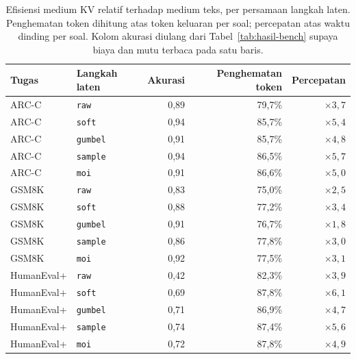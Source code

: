 \begin{table}[htbp]
\centering
\caption{Efisiensi medium KV relatif terhadap medium teks, per persamaan langkah laten. Penghematan token dihitung atas token keluaran per soal; percepatan atas waktu dinding per soal. Kolom akurasi diulang dari Tabel~\ref{tab:hasil-bench} supaya biaya dan mutu terbaca pada satu baris.}
\label{tab:efisiensi}
\small
\begin{tabular}{llrrr}
\hline
Tugas & Langkah laten & Akurasi & Penghematan token & Percepatan \\
\hline
ARC-C & \texttt{raw} & 0,89 & 79,7\% & $\times3,7$ \\
ARC-C & \texttt{soft} & 0,94 & 85,7\% & $\times5,4$ \\
ARC-C & \texttt{gumbel} & 0,91 & 85,7\% & $\times4,8$ \\
ARC-C & \texttt{sample} & 0,94 & 86,5\% & $\times5,7$ \\
ARC-C & \texttt{moi} & 0,91 & 86,6\% & $\times5,0$ \\
\hline
GSM8K & \texttt{raw} & 0,83 & 75,0\% & $\times2,5$ \\
GSM8K & \texttt{soft} & 0,88 & 77,2\% & $\times3,4$ \\
GSM8K & \texttt{gumbel} & 0,91 & 76,7\% & $\times1,8$ \\
GSM8K & \texttt{sample} & 0,86 & 77,8\% & $\times3,0$ \\
GSM8K & \texttt{moi} & 0,92 & 77,5\% & $\times3,1$ \\
\hline
HumanEval+ & \texttt{raw} & 0,42 & 82,3\% & $\times3,9$ \\
HumanEval+ & \texttt{soft} & 0,69 & 87,8\% & $\times6,1$ \\
HumanEval+ & \texttt{gumbel} & 0,71 & 86,9\% & $\times4,7$ \\
HumanEval+ & \texttt{sample} & 0,74 & 87,4\% & $\times5,6$ \\
HumanEval+ & \texttt{moi} & 0,72 & 87,8\% & $\times4,9$ \\
\hline
\end{tabular}
\end{table}

